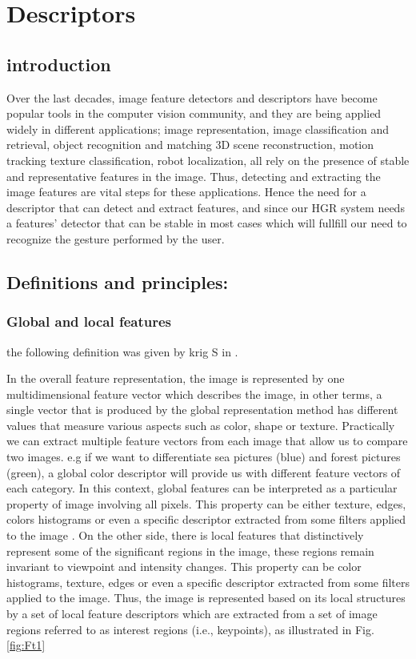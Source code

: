 
\chapter{Descriptors}\label{descriptors}

\section{introduction}

Over the last decades, image feature detectors and descriptors have become popular tools in the computer vision community,  and they are being applied widely in different applications; image representation, image classification and retrieval, object recognition and matching  3D scene reconstruction, motion tracking   texture classification, robot localization, all rely on the presence of stable and representative features in the image. Thus, detecting and extracting the image features are vital steps for these applications.
Hence the need for a descriptor that can detect and extract features,
and since our HGR system needs a features' detector that can be stable in most cases which will fullfill our need to recognize the gesture performed by the user.


\section{Definitions and principles:}

\subsection{Global and local features}
the following definition was given by krig S in \cite{krig}. 

In the overall feature representation, the image is represented by one multidimensional feature vector which describes the image, in other terms, a single vector that is produced by the global representation method has different values that measure various aspects such as color, shape or texture. Practically we can extract multiple feature vectors from each image that allow us to compare two images. e.g if we want to differentiate sea pictures (blue) and forest pictures (green), a global color descriptor will provide us with different feature vectors of each category. In this context,  global features can be interpreted
as a particular property of image involving all pixels.
This property can be either texture, edges, colors histograms or even a specific descriptor extracted from some filters applied to the image \cite{h}.
On the other side, there is local features that distinctively represent some of the significant regions in the image, these regions remain invariant to viewpoint and intensity changes. 
This property can be color histograms, texture, edges or even a specific descriptor extracted from some filters
applied to the image. Thus, the image is represented
based on its local structures by a set of local feature descriptors which are extracted
from a set of image regions referred to as interest regions (i.e., keypoints), as illustrated in
Fig.\ref{fig:Ft1}

